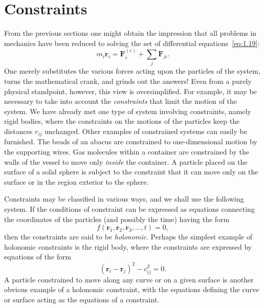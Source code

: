 \section{Constraints}

From the previous sections one might obtain the impression that all problems in mechanics have been reduced to solving the set of differential equations~\eqref{eq:1.19}:
\begin{equation*}
    m_i\ddot{\symbf{r}}_i=\symbf{F}_i^{\left(e\right)}+\sum_j\symbf{F}_{ji}.
\end{equation*}
One merely substitutes the various forces acting upon the particles of the system, turns the mathematical crank, and grinds out the answers! Even from a purely physical standpoint, however, this view is oversimplified. For example, it may be necessary to take into account the \emph{constraints} that limit the motion of the system. We have already met one type of system involving constraints, namely rigid bodies, where the constraints on the motions of the particles keep the distances \(r_{ij}\) unchanged. Other examples of constrained systems can easily be furnished. The beads of an abacus are constrained to one-dimensional motion by the supporting wires. Gas molecules within a container are constrained by the walls of the vessel to move only \emph{inside} the container. A particle placed on the surface of a solid sphere is subject to the constraint that it can move only on the surface or in the region exterior to the sphere.

Constraints may be classified in various ways, and we shall use the following system. If the conditions of constraint can be expressed as equations connecting the coordinates of the particles (and possibly the time) having the form
\begin{equation}
    f\left(\symbf{r}_1,\symbf{r}_2,\symbf{r}_3,\ldots,t\right)=0,\label{eq:1.37}
\end{equation}
then the constraints are said to be \emph{holonomic}. Perhaps the simplest example of holonomic constraints is the rigid body, where the constraints are expressed by equations of the form
\begin{equation*}
    \left(\symbf{r}_i-\symbf{r}_j\right)^2-c_{ij}^2=0.
\end{equation*}
A particle constrained to move along any curve or on a given surface is another obvious example of a holonomic constraint, with the equations defining the curve or surface acting as the equations of a constraint.

